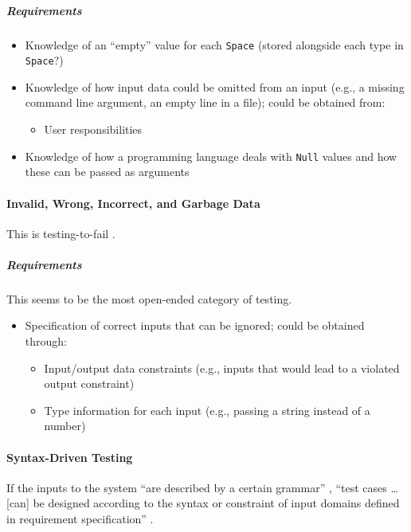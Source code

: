 \subparagraph{Requirements}
\begin{itemize}
      \item Knowledge of an ``empty'' value for each \texttt{Space} (stored
            alongside each type in \texttt{Space}?)
      \item Knowledge of how input data could be omitted from an input
            (e.g., a missing command line argument, an empty line in a file);
            could be obtained from:
            \begin{itemize}
                  \item User responsibilities
            \end{itemize}
      \item Knowledge of how a programming language deals with \texttt{Null}
            values and how these can be passed as arguments
\end{itemize}

\paragraph{Invalid, Wrong, Incorrect, and Garbage Data
      \citep[pp.~78-79]{Patton2006}}

This is testing-to-fail \citep[p.~77]{Patton2006}.

\subparagraph{Requirements}
This seems to be the most open-ended category of testing.
\begin{itemize}
      \item Specification of correct inputs that can be ignored;
            could be obtained through:
            \begin{itemize}
                  \item Input/output data constraints (e.g., inputs that would
                        lead to a violated output constraint)
                  \item Type information for each input (e.g., passing a string
                        instead of a number)
            \end{itemize}
\end{itemize}

\paragraph{Syntax-Driven Testing \citep[pp.~448-449]{PetersAndPedrycz2000}}

If the inputs to the system ``are described by a certain grammar''
\citep[p.~448]{PetersAndPedrycz2000}, ``test cases \dots [can] be designed
according to the syntax or constraint of input domains defined in requirement
specification'' \citep[p.~260]{IntanaEtAl2020}
.


